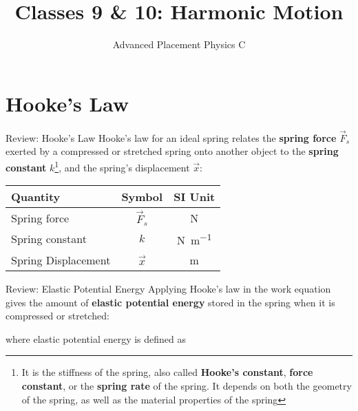 \documentclass[12pt,compress,aspectratio=169]{beamer}
\title{Classes 9 \& 10: Harmonic Motion}
\subtitle{Advanced Placement Physics C}
\begin{document}
\begin{frame}
  \maketitle
\end{frame}


\section{Hooke's Law}

\begin{frame}{Review: Hooke's Law}
  Hooke's law for an ideal spring relates the \textbf{spring force} $\vec F_s$
  exerted by a compressed or stretched spring onto another object to the
  \textbf{spring constant} $k$\footnote{It is the stiffness of the spring, also
  called \textbf{Hooke's constant}, \textbf{force constant}, or the
  \textbf{spring rate} of the spring. It depends on both the geometry of the
  spring, as well as the material properties of the spring}, and the spring's
  displacement $\vec x$:

  
  \begin{center}
    \begin{tabular}{l|c|c}
      \rowcolor{pink}
      \textbf{Quantity} & \textbf{Symbol} & \textbf{SI Unit} \\ \hline
      Spring force        & $\vec F_s$ & \si\newton \\
      Spring constant     & $k$        & \si{\newton\per\metre}\\
      Spring Displacement & $\vec x$   & \si\metre
    \end{tabular}
  \end{center}
  \vspace{.3in}
\end{frame}



\begin{frame}{Review: Elastic Potential Energy}
  Applying Hooke's law in the work equation gives the amount of \textbf{elastic
    potential energy} stored in the spring when it is compressed or stretched:


  where elastic potential energy is defined as

\end{frame}
\end{document}
